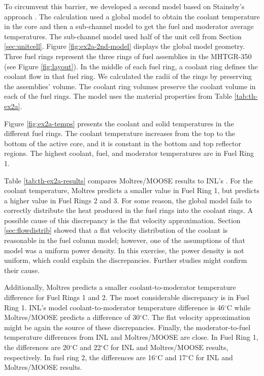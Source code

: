 To circumvent this barrier, we developed a second model based on Stainsby's approach \cite{stainsby_investigation_2008}.
The calculation used a global model to obtain the coolant temperature in the core and then a sub-channel model to get the fuel and moderator average temperatures.
The sub-channel model used half of the unit cell from Section \ref{sec:unitcell}.
Figure \ref{fig:ex2a-2nd-model} displays the global model geometry.
Three fuel rings represent the three rings of fuel assemblies in the MHTGR-350 (see Figure \ref{fig:layout}).
In the middle of each fuel ring, a coolant ring defines the coolant flow in that fuel ring.
We calculated the radii of the rings by preserving the assemblies' volume.
The coolant ring volumes preserve the coolant volume in each of the fuel rings.
The model uses the material properties from Table \ref{tab:th-ex2a}.

Figure \ref{fig:ex2a-temps} presents the coolant and solid temperatures in the different fuel rings.
The coolant temperature increases from the top to the bottom of the active core, and it is constant in the bottom and top reflector regions.
The highest coolant, fuel, and moderator temperatures are in Fuel Ring 1.

Table \ref{tab:th-ex2a-results} compares Moltres/MOOSE results to INL's \cite{strydom_inl_2013}.
For the coolant temperature, Moltres predicts a smaller value in Fuel Ring 1, but predicts a higher value in Fuel Rings 2 and 3.
For some reason, the global model fails to correctly distribute the heat produced in the fuel rings into the coolant rings.
A possible cause of this discrepancy is the flat velocity approximation.
Section \ref{sec:flowdistrib} showed that a flat velocity distribution of the coolant is reasonable in the fuel column model; however, one of the assumptions of that model was a uniform power density.
In this exercise, the power density is not uniform, which could explain the discrepancies.
Further studies might confirm their cause.

Additionally, Moltres predicts a smaller coolant-to-moderator temperature difference for Fuel Rings 1 and 2.
The most considerable discrepancy is in Fuel Ring 1.
INL's model coolant-to-moderator temperature difference is 46$^{\circ}$C while Moltres/MOOSE predicts a difference of 30$^{\circ}$C.
The flat velocity approximation might be again the source of these discrepancies.
Finally, the moderator-to-fuel temperature differences from INL and Moltres/MOOSE are close.
In Fuel Ring 1, the differences are 20$^{\circ}$C and 22$^{\circ}$C for INL and Moltres/MOOSE results, respectively.
In fuel ring 2, the differences are 16$^{\circ}$C and 17$^{\circ}$C for INL and Moltres/MOOSE results.

